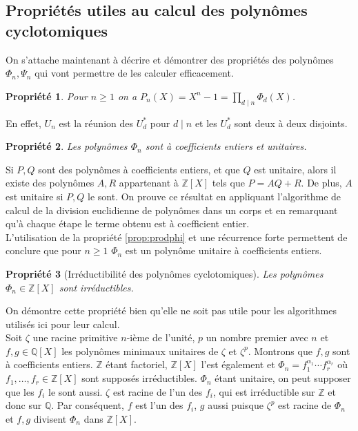 \documentclass{article}
\theoremstyle{break}                  %
\newtheorem{propriete}{Propriété}
\begin{document}
\subsection*{Propriétés utiles au calcul des polynômes cyclotomiques}
On s'attache maintenant à décrire et démontrer des propriétés des polynômes $\Phi_n, \Psi_n$ qui vont permettre de les calculer efficacement. 

\begin{propriete}
	Pour $n \ge 1$ on a $P_n(X) = X^n-1 = \prod_{ d \mid n} \Phi_d(X)$.
\end{propriete}
En effet, $U_n$ est la réunion des $U_d^*$ pour $d \mid n$ et les $U_d^*$ sont deux à deux disjoints.

\begin{propriete}
	Les polynômes $\Phi_n$ sont à coefficients entiers et unitaires.
\end{propriete}
Si $P, Q$ sont des polynômes à coefficients entiers, et que $Q$ est unitaire, alors il existe des polynômes $A,R$ appartenant à $\mathbb Z[X]$ tels que $P = AQ + R$. De plus, $A$ est unitaire si $P, Q$ le sont. On prouve ce résultat en appliquant l'algorithme de calcul de la division euclidienne de polynômes dans un corps et en remarquant qu'à chaque étape le terme obtenu est à coefficient entier.\\
L'utilisation de la propriété \ref{prop:prodphi} et une récurrence forte permettent de conclure que pour $n \ge 1$ $\Phi_n$ est un polynôme unitaire à coefficients entiers.

\begin{propriete}[Irréductibilité des polynômes cyclotomiques]
	Les polynômes $\Phi_n \in \mathbb Z[X]$ sont irréductibles.
\end{propriete}
On démontre cette propriété bien qu'elle ne soit pas utile pour les algorithmes utilisés ici pour leur calcul.\\

Soit $\zeta$ une racine primitive $n$-ième de l'unité, $p$ un nombre premier avec $n$ et $f,g \in \mathbb Q[X]$ les polynômes minimaux unitaires de $\zeta$ et $\zeta^p$. Montrons que $f,g$ sont à coefficients entiers. $\mathbb Z$ étant factoriel, $\mathbb Z[X]$ l'est également et $\Phi_n = f_1^{\alpha_1} \cdots f_r^{\alpha_r}$ où $f_1, \dots ,f_r \in \mathbb Z[X]$ sont supposés irréductibles. $\Phi_n$ étant unitaire, on peut supposer que les $f_i$ le sont aussi. $\zeta$ est racine de l'un des $f_i$, qui est irréductible sur $\mathbb Z$ et donc sur $\mathbb Q$. Par conséquent, $f$ est l'un des $f_i$, $g$ aussi puisque $\zeta^p$ est racine de $\Phi_n$ et $f,g$ divisent $\Phi_n$ dans $\mathbb Z[X]$.\\
\end{document}

